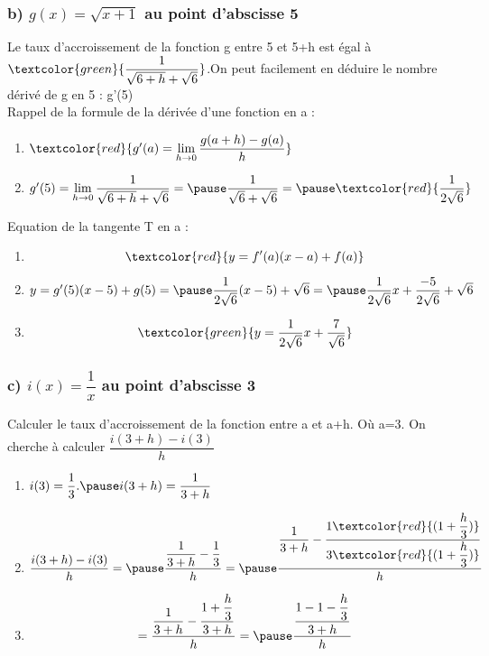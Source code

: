 \documentclass[t]{beamer}
\begin{document}
	\begin{frame}[label=pagebanale]
		\frametitle{b) $g(x) = \sqrt{x+1}$ au point d'abscisse 5}
		\pause
		Le taux d'accroissement de la fonction g entre 5 et 5+h est égal à \pause $\textcolor{green}{\dfrac{1}{\sqrt{6+h} + \sqrt{6}}}$.\pause On peut facilement en déduire le nombre dérivé de g en 5 : g'(5) \\
		\pause
		Rappel de la formule de la dérivée d'une fonction en a :
		\pause 
		\begin{enumerate}[]
			\item<+-> \(\textcolor{red}{g'(a) = \lim\limits_{h \rightarrow 0}\dfrac{g(a+h)-g(a)}{h}}\)
			\item<+-> \(g'(5) = \lim\limits_{h \rightarrow 0}\dfrac{1}{\sqrt{6+h} + \sqrt{6}} = \pause \dfrac{1}{\sqrt{6} + \sqrt{6}} = \pause \textcolor{red}{\dfrac{1}{2\sqrt{6}}}\)
			\pause
		\end{enumerate}

		Equation de la tangente T en a :
		\pause
		\begin{enumerate}[]
			\item<+-> \[\textcolor{red}{y = f'(a)(x-a) + f(a)}\]
			\item<+-> \(y=g'(5)(x-5) + g(5) = \pause \dfrac{1}{2 \sqrt{6}}(x-5) + \sqrt{6}  = \pause \dfrac{1}{2 \sqrt{6}}x + \dfrac{-5}{2 \sqrt{6}} + \sqrt{6} \)
			\pause
			\item<+-> \[\textcolor{green}{y = \dfrac{1}{2\sqrt{6}}x + \dfrac{7}{\sqrt{6}}}\]
		\end{enumerate}
	\end{frame}

	\begin{frame}
		\frametitle{c) $i(x) = \dfrac{1}{x}$ au point d'abscisse 3}
		\pause
		Calculer le taux d'accroissement de la fonction entre a et a+h. \pause Où a=3.
		\pause
		On cherche à calculer \( \dfrac{i(3+h) - i(3)}{h} \)
		\pause
		\begin{enumerate}[]
			\item<+-> \(i(3) = \dfrac{1}{3}. \pause i(3+h) = \dfrac{1}{3+h}\) 
			\pause
			\item<+-> \[\dfrac{i(3+h) - i(3)}{h} = \pause \dfrac{\dfrac{1}{3+h} - \dfrac{1}{3} }{h} = \pause \dfrac{\dfrac{1}{3+h}-\dfrac{1\textcolor{red}{(1+\dfrac{h}{3})}}{3\textcolor{red}{(1+\dfrac{h}{3})}}}{h}\]
			\pause
			\item<+-> \[ = \dfrac{\dfrac{1}{3+h}-\dfrac{1+\dfrac{h}{3}}{3+h}}{h} = \pause \dfrac{\dfrac{1-1-\dfrac{h}{3}}{3+h}}{h} \]
		\end{enumerate}
	\end{frame}
\end{document}
